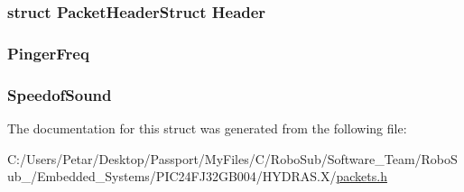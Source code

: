 \subsubsection[{Header}]{\setlength{\rightskip}{0pt plus 5cm}struct {\bf Packet\+Header\+Struct} Header}\label{struct_packet_variable_set_struct_ab201af50281aff5ed4f984f994938007}
\hypertarget{struct_packet_variable_set_struct_a06fd1f9ebef45b2d268a1aebea84d828}{}
\subsubsection[{Pinger\+Freq}]{ Pinger\+Freq}\label{struct_packet_variable_set_struct_a06fd1f9ebef45b2d268a1aebea84d828}
\hypertarget{struct_packet_variable_set_struct_aa471f2dae040fec6c10389988ebf3fb6}{}
\subsubsection[{Speedof\+Sound}]{ Speedof\+Sound}\label{struct_packet_variable_set_struct_aa471f2dae040fec6c10389988ebf3fb6}


The documentation for this struct was generated from the following file\+:\begin{DoxyCompactItemize}
\item 
C\+:/\+Users/\+Petar/\+Desktop/\+Passport/\+My\+Files/\+C/\+Robo\+Sub/\+Software\+\_\+\+Team/\+Robo\+Sub\+\_/\+Embedded\+\_\+\+Systems/\+P\+I\+C24\+F\+J32\+G\+B004/\+H\+Y\+D\+R\+A\+S.\+X/\hyperlink{_h_y_d_r_a_s_8_x_2packets_8h}{packets.\+h}\end{DoxyCompactItemize}

